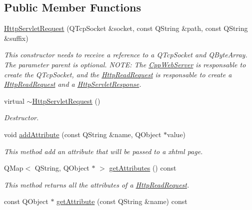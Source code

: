 \subsection*{Public Member Functions}
\begin{DoxyCompactItemize}
\item 
\hyperlink{class_c_w_f_1_1_http_servlet_request_a9fdd1aeaccd42c3043bff902cf6e6e09}{Http\+Servlet\+Request} (Q\+Tcp\+Socket \&socket, const Q\+String \&path, const Q\+String \&suffix)
\begin{DoxyCompactList}\small\item\em This constructor needs to receive a reference to a Q\+Tcp\+Socket and Q\+Byte\+Array. The parameter parent is optional. N\+O\+T\+E\+: The \hyperlink{class_c_w_f_1_1_cpp_web_server}{Cpp\+Web\+Server} is responsable to create the Q\+Tcp\+Socket, and the \hyperlink{class_c_w_f_1_1_http_read_request}{Http\+Read\+Request} is responsable to create a \hyperlink{class_c_w_f_1_1_http_read_request}{Http\+Read\+Request} and a \hyperlink{class_c_w_f_1_1_http_servlet_response}{Http\+Servlet\+Response}. \end{DoxyCompactList}\item 
virtual \hyperlink{class_c_w_f_1_1_http_servlet_request_a41867870bf0c9f23ef74d70b10c0d357}{$\sim$\+Http\+Servlet\+Request} ()
\begin{DoxyCompactList}\small\item\em Destructor. \end{DoxyCompactList}\item 
void \hyperlink{class_c_w_f_1_1_http_servlet_request_ad4777049d7043e62535fa658fd61be1d}{add\+Attribute} (const Q\+String \&name, Q\+Object $\ast$value)
\begin{DoxyCompactList}\small\item\em This method add an attribute that will be passed to a xhtml page. \end{DoxyCompactList}\item 
Q\+Map$<$ Q\+String, Q\+Object $\ast$ $>$ \hyperlink{class_c_w_f_1_1_http_servlet_request_a3855042c53725e7ef753bee620e01297}{get\+Attributes} () const 
\begin{DoxyCompactList}\small\item\em This method returns all the attributes of a \hyperlink{class_c_w_f_1_1_http_read_request}{Http\+Read\+Request}. \end{DoxyCompactList}\item 
const Q\+Object $\ast$ \hyperlink{class_c_w_f_1_1_http_servlet_request_a6833f3628440cfa4a6dc45fcd6783eee}{get\+Attribute} (const Q\+String \&name) const 

\end{DoxyCompactItemize}
